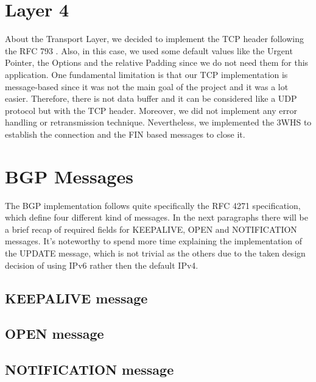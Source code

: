 \section{Layer 4}
About the Transport Layer, we decided to implement the TCP header following the RFC 793 \cite{rfc793}.
Also, in this case, we used some default values like the Urgent Pointer, the Options and the relative Padding since we do not need them for this application.\newline
One fundamental limitation is that our TCP implementation is message-based since it was not the main goal of the project and it was a lot easier.
Therefore, there is not data buffer and it can be considered like a UDP protocol but with the TCP header.
Moreover, we did not implement any error handling or retransmission technique.\newline
Nevertheless, we implemented the 3WHS to establish the connection and the FIN based messages to close it.

\section{BGP Messages}
The BGP implementation follows quite specifically the RFC 4271 specification, which define four different kind of messages.
In the next paragraphs there will be a brief recap of required fields for KEEPALIVE, OPEN and NOTIFICATION messages. It's noteworthy to spend more time explaining the implementation of the UPDATE message, which is not trivial as the others due to the taken design decision of using IPv6 rather then the default IPv4.


\subsection{KEEPALIVE message}



\subsection{OPEN message}



\subsection{NOTIFICATION message}


